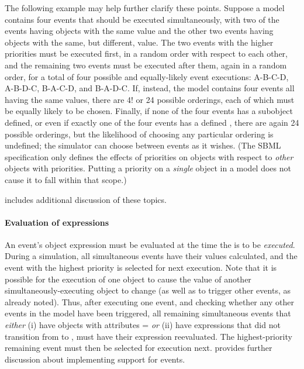 The following example may help further clarify these points.
Suppose a model contains four events that should be executed
simultaneously, with two of the events having \Priority objects
with the same value and the other two events having \Priority
objects with the same, but different, value.  The two events with
the higher priorities must be executed first, in a random order
with respect to each other, and the remaining two events must be
executed after them, again in a random order, for a total of four
possible and equally-likely event executions: A-B-C-D, A-B-D-C,
B-A-C-D, and B-A-D-C.  If, instead, the model contains four events
all having the same \Priority values, there are 4! or 24
possible orderings, each of which must be equally likely to be
chosen.  Finally, if none of the four events has a \Priority
subobject defined, or even if exactly one of the four events has a
defined \Priority, there are again 24 possible orderings, but the
likelihood of choosing any particular ordering is undefined; the
simulator can choose between events as it wishes.  (The SBML
specification only defines the effects of priorities on \Event
objects with respect to \emph{other} \Event objects with
priorities.  Putting a priority on a \emph{single} \Event object
in a model does not cause it to fall within that scope.)

 includes additional discussion
of these topics.


\paragraph{Evaluation of  expressions}

An event's \Priority object  expression must be
evaluated at the time the \Event is to be \emph{executed}.  During
a simulation, all simultaneous events have their \Priority values
calculated, and the event with the highest priority is selected for
next execution.  Note that it is possible for the execution of one
\Event object to cause the \Priority value of another
simultaneously-executing \Event object to change (as well as to
trigger other events, as already noted).  Thus, after executing
one event, and checking whether any other events in the model have
been triggered, all remaining simultaneous events that
\emph{either} (i) have \Trigger objects with attributes
= \emph{or} (ii) have \Trigger
expressions that did not transition from  to
, must have their \Priority expression reevaluated.
The highest-priority remaining event must then be selected for 
execution next.   provides further
discussion about implementing support for events.


